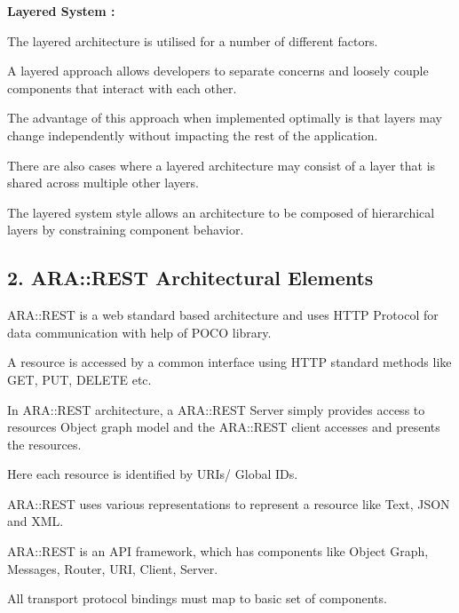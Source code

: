 \begin{DoxyItemize}
\item {\bfseries Layered System \+:}
\begin{DoxyItemize}
\item The layered architecture is utilised for a number of different factors.
\item A layered approach allows developers to separate concerns and loosely couple components that interact with each other.
\item The advantage of this approach when implemented optimally is that layers may change independently without impacting the rest of the application.
\item There are also cases where a layered architecture may consist of a layer that is shared across multiple other layers.
\item The layered system style allows an architecture to be composed of hierarchical layers by constraining component behavior. 
\end{DoxyItemize}
\end{DoxyItemize}

\subsection*{2. A\+R\+A\+::\+R\+E\+ST Architectural Elements}


\begin{DoxyItemize}
\item A\+R\+A\+::\+R\+E\+ST is a web standard based architecture and uses H\+T\+TP Protocol for data communication with help of P\+O\+CO library.
\item A resource is accessed by a common interface using H\+T\+TP standard methods like G\+ET, P\+UT, D\+E\+L\+E\+TE etc.
\item In A\+R\+A\+::\+R\+E\+ST architecture, a A\+R\+A\+::\+R\+E\+ST Server simply provides access to resources Object graph model and the A\+R\+A\+::\+R\+E\+ST client accesses and presents the resources.
\item Here each resource is identified by U\+R\+Is/ Global I\+Ds.
\item A\+R\+A\+::\+R\+E\+ST uses various representations to represent a resource like Text, J\+S\+ON and X\+ML.
\item A\+R\+A\+::\+R\+E\+ST is an A\+PI framework, which has components like Object Graph, Messages, Router, U\+RI, Client, Server.
\item All transport protocol bindings must map to basic set of components.
\end{DoxyItemize}

